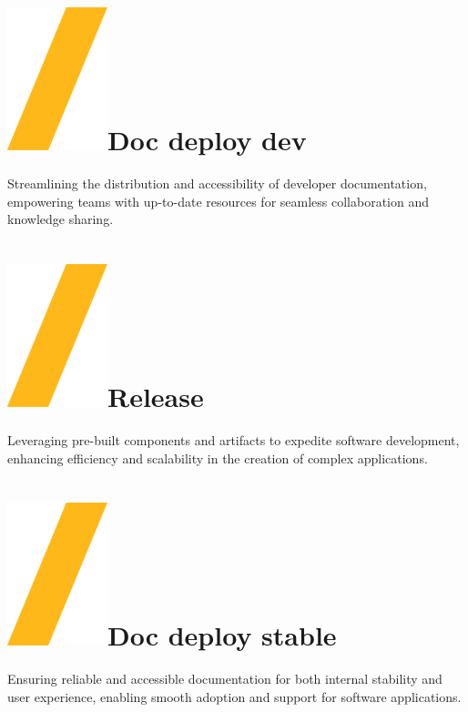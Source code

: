 \documentclass[a0paper,fleqn]{src/betterposter}
\begin{document}
{\section{\includegraphics[height=\fontcharht\font`\S]{img/example/slash.png}Doc deploy dev}
Streamlining the distribution and accessibility of developer documentation,
empowering teams with up-to-date resources for seamless collaboration and
knowledge sharing.

\section{\includegraphics[height=\fontcharht\font`\S]{img/example/slash.png}Release}
Leveraging pre-built components and artifacts to expedite software development,
enhancing efficiency and scalability in the creation of complex applications.

\section{\includegraphics[height=\fontcharht\font`\S]{img/example/slash.png}Doc deploy stable}
Ensuring reliable and accessible documentation for both internal stability and
user experience, enabling smooth adoption and support for software applications.



}
\end{document}
